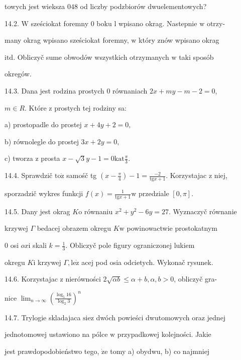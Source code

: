 \documentclass[a4paper,12pt]{article}
\begin{document}
towych jest wieksza $048$ od liczby podzbiorów dwuelementowych?

14.2. $\mathrm{W}$ sześciokat foremny $0$ boku l wpisano okrag. Nastepnie $\mathrm{w}$ otrzy-

many okrag wpisano sześciokat foremny, $\mathrm{w}$ który znów wpisano okrag

$\mathrm{i}\mathrm{t}\mathrm{d}$. Obliczyč sume obwodów wszystkich otrzymanych $\mathrm{w}$ taki sposób

okregów.

14.3. Dana jest rodzina prostych $0$ równaniach $2x+my-m-2 = 0,$

$m\in R$. Które $\mathrm{z}$ prostych tej rodziny sa:

a) prostopadle do prostej $x+4y+2=0,$

b) równolegle do prostej $3x+2y=0,$

c) tworza $\mathrm{z}$ prosta $x-\displaystyle \sqrt{3}y-1=0\mathrm{k}\mathrm{a}\mathrm{t}\frac{\pi}{3}.$

14.4. Sprawdzič $\mathrm{t}\mathrm{o}\dot{\mathrm{z}}$ samośč tg $(x-\displaystyle \frac{\pi}{4})-1=\frac{-2}{\mathrm{t}\mathrm{g}x+1}$. Korzystajac $\mathrm{z}$ niej,

sporzadzič wykres funkcji $f(x)=\displaystyle \frac{1}{\mathrm{t}\mathrm{g}x+1}\mathrm{w}$ przedziale $[0,\pi].$

14.5. Dany jest okrag $K\mathrm{o}$ równaniu $x^{2}+y^{2}-6y=27$. Wyznaczyč równanie

krzywej $\Gamma$ bedacej obrazem okregu $K\mathrm{w}$ powinowactwie prostokatnym

$0$ osi $ox \mathrm{i}$ skali $k = \displaystyle \frac{1}{3}$. Obliczyč pole figury ograniczonej lukiem

okregu $K\mathrm{i}$ krzywej $\Gamma, \mathrm{l}\mathrm{e}\dot{\mathrm{z}}$ acej pod osia odcietych. Wykonač rysunek.

14.6. Korzystajac $\mathrm{z}$ nierówności $2\sqrt{\alpha b} \leq \alpha+b, \alpha, b > 0$, obliczyč gra-

nice $\displaystyle \lim_{n\rightarrow\infty}(\frac{\log_{5}16}{\log_{2}3})^{n}$

14.7. Trylogie skladajaca $\mathrm{s}\mathrm{i}\mathrm{e}\mathrm{z}$ dwóch powieści dwutomowych oraz jednej

jednotomowej ustawiono na pólce $\mathrm{w}$ przypadkowej kolejności. Jakie

jest prawdopodobieństwo tego, $\dot{\mathrm{z}}\mathrm{e}$ tomy a) obydwu, b) co najmniej
\end{document}

